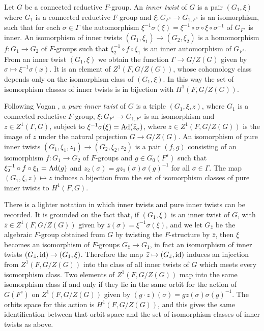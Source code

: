 \documentclass{article}
\theoremstyle{definition}
\numberwithin{equation}{section}
\renewcommand{\-}{\hyp{}}
\begin{document}
Let $G$ be a connected reductive $F$-group. An \emph{inner twist} of $G$ is a pair $(G_1,\xi)$ where $G_1$ is a connected reductive $F$-group and $\xi : G_{F^s} \to G_{1,F^s}$ is an isomorphism, such that for each $\sigma \in \Gamma$ the automorphism $\xi^{-1}\sigma(\xi) = \xi^{-1}\circ\sigma\circ\xi\circ\sigma^{-1}$ of $G_{F^s}$ is inner. An isomorphism of inner twists $(G_1,\xi_1) \to (G_2,\xi_2)$ is a homomorphism $f : G_1 \to G_2$ of $F$-groups such that $\xi_2^{-1}\circ f \circ \xi_1$ is an inner automorphism of $G_{F^s}$. From an inner twist $(G_1,\xi)$ we obtain the function $\Gamma \to G/Z(G)$ given by $\sigma \mapsto \xi^{-1}\sigma(x)$. It is an element of $Z^1(F,G/Z(G))$, whose cohomology class depends only on the isomorphism class of $(G_1,\xi)$. In this way the set of isomorphism classes of inner twists is in bijection with $H^1(F,G/Z(G))$.



Following Vogan \cite{Vog93}, a \emph{pure inner twist} of $G$ is a triple $(G_1,\xi,z)$, where $G_1$ is a connected reductive $F$-group, $\xi : G_{F^s} \to G_{1,F^s}$ is an isomorphism and $z \in Z^1(\Gamma,G)$, subject to $\xi^{-1}\sigma(\xi)=\textrm{Ad}(\bar z_\sigma)$, where $\bar z \in Z^1(F,G/Z(G))$ is the image of $z$ under the natural projection $G \to G/Z(G)$. An isomorphism of pure inner twists $(G_1,\xi_1,z_1) \to (G_2,\xi_2,z_2)$ is a pair $(f,g)$ consisting of an isomorphism $f : G_1 \to G_2$ of $F$-groups and $g \in G_0(F^s)$ such that $\xi_2^{-1}\circ f \circ \xi_1=\textrm{Ad}(g)$ and $z_2(\sigma)=gz_1(\sigma)\sigma(g)^{-1}$ for all $\sigma \in \Gamma$. The map $(G_1,\xi,z) \mapsto z$ induces a bijection from the set of isomorphism classes of pure inner twists to $H^1(F,G)$.

There is a lighter notation in which inner twists and pure inner twists can be recorded. It is grounded on the fact that, if $(G_1,\xi)$ is an inner twist of $G$, with $\bar z \in Z^1(F,G/Z(G))$ given by $\bar z(\sigma)=\xi^{-1}\sigma(\xi)$, and we let $G_{\bar z}$ be the algebraic $F$-group obtained from $G$ by twisting the $F$-structure by $\bar z$, then $\xi$ becomes an isomorphism of $F$-groups $G_{\bar z} \to G_1$, in fact an isomorphism of inner twists $(G_{\bar z},\textrm{id}) \to (G_1,\xi)$. Therefore the map $\bar z \mapsto (G_{\bar z},\textrm{id})$ induces an injection from $Z^1(F,G/Z(G))$ into the class of all inner twists of $G$ which meets every isomorphism class. Two elements of $Z^1(F,G/Z(G))$ map into the same isomorphism class if and only if they lie in the same orbit for the action of $G(F^s)$ on $Z^1(F,G/Z(G))$ given by $(g \cdot z)(\sigma) = gz(\sigma)\sigma(g)^{-1}$. The orbits space for this action is $H^1(F,G/Z(G))$, and this gives the same identification between that orbit space and the set of isomorphism classes of inner twists as above.
\end{document}
